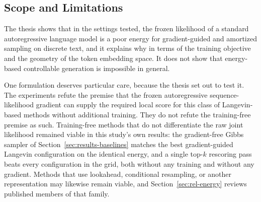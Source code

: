\subsection{Scope and Limitations}
\label{sec:disc-scope}

The thesis shows that in the settings tested, the frozen likelihood of a standard autoregressive language model is a poor energy for gradient-guided and amortized sampling on discrete text, and it explains why in terms of the training objective and the geometry of the token embedding space. It does not show that energy-based controllable generation is impossible in general.

One formulation deserves particular care, because the thesis set out to test it. The experiments refute the premise that the frozen autoregressive sequence-likelihood gradient can supply the required local score for this class of Langevin-based methods without additional training. They do not refute the training-free premise as such. Training-free methods that do not differentiate the raw joint likelihood remained viable in this study's own results: the gradient-free Gibbs sampler of Section~\ref{sec:results-baselines} matches the best gradient-guided Langevin configuration on the identical energy, and a single top-$k$ rescoring pass beats every configuration in the grid, both without any training and without any gradient. Methods that use lookahead, conditional resampling, or another representation may likewise remain viable, and Section~\ref{sec:rel-energy} reviews published members of that family.


